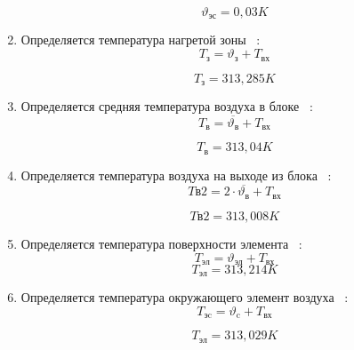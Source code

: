 \begin{enumerate}[label={\arabic*.}]
  $$\vartheta\mathrm{_{эс}} = 0,03 K$$

\item Определяется температура нагретой зоны ~\cite{Rotkop1976}:
  \begin{equation}
    T\mathrm{_{з}} = \vartheta\mathrm{_{з}} + T\mathrm{_{вх}}
  \end{equation}

  $$T\mathrm{_{з}} = 313,285K$$
  
\item Определяется средняя температура воздуха в блоке ~\cite{Rotkop1976}:
  \begin{equation}
    T\mathrm{_{в}} = \overline{\vartheta\mathrm{_{в}}} + T\mathrm{_{вх}}
  \end{equation}
  
  $$ T\mathrm{_{в}} = 313,04K$$
 
\item Определяется температура воздуха на выходе из
  блока ~\cite{Rotkop1976}:
  \begin{equation}
    T\mathrm{в2} = 2\cdot \overline{\vartheta\mathrm{_{в}}} + T\mathrm{_{вх}}
  \end{equation}
  
  $$ T\mathrm{в2} = 313,008K$$
  
\item Определяется температура поверхности элемента ~\cite{Rotkop1976}:
  \begin{equation}
    T\mathrm{_{эл}} = \vartheta\mathrm{_{эл}}  + T\mathrm{_{вх}}
  \end{equation}
  $$    T\mathrm{_{эл}} = 313,214K$$
  
\item Определяется температура окружающего
  элемент воздуха ~\cite{Rotkop1976}:
  \begin{equation}
        T\mathrm{_{эc}} = \vartheta\mathrm{_{c}} + T\mathrm{_{вх}}
    \end{equation}

 $$    T\mathrm{_{эл}} = 313,029K$$

  
\end{enumerate}
\newpage %
